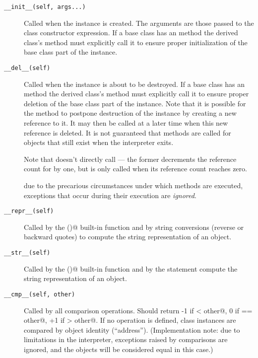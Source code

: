 \begin{description}

\item[{\tt __init__(self, args...)}]
Called when the instance is created.  The arguments are those passed
to the class constructor expression.  If a base class has an
 method the derived class's  method must
explicitly call it to ensure proper initialization of the base class
part of the instance.


\item[{\tt __del__(self)}]
Called when the instance is about to be destroyed.  If a base class
has an  method the derived class's  method
must explicitly call it to ensure proper deletion of the base class
part of the instance.  Note that it is possible for the 
method to postpone destruction of the instance by creating a new
reference to it.  It may then be called at a later time when this new
reference is deleted.  It is not guaranteed that
 methods are called for objects that still exist when
the interpreter exits.

Note that  doesn't directly call  --- the
former decrements the reference count for  by one, but
 is only called when its reference count reaches zero.

 due to the precarious circumstances under which
 methods are executed, exceptions that occur during
their execution are \emph{ignored}.

\item[{\tt __repr__(self)}]
Called by the \verb@repr()@ built-in function and by string conversions
(reverse or backward quotes) to compute the string representation of an object.

\item[{\tt __str__(self)}]
Called by the \verb@str()@ built-in function and by the \verb@print@
statement compute the string representation of an object.

\item[{\tt __cmp__(self, other)}]
Called by all comparison operations.  Should return -1 if
\verb@self < other@,  0 if \verb@self == other@, +1 if
\verb@self > other@.  If no  operation is defined, class
instances are compared by object identity (``address'').
(Implementation note: due to limitations in the interpreter,
exceptions raised by comparisons are ignored, and the objects will be
considered equal in this case.)


\end{description}

